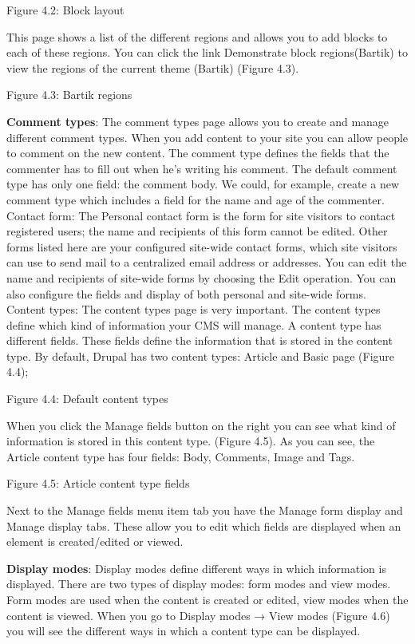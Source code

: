 Figure 4.2: Block layout

This page shows a list of the different regions and allows you to add blocks to each of these regions. You can click the link Demonstrate block regions(Bartik) to view the regions of the current theme (Bartik) (Figure 4.3).

Figure 4.3: Bartik regions

\textbf{Comment types}: The comment types page allows you to create and manage different comment types. When you add content to your site you can allow people to comment on the new content. The comment type defines the fields that the commenter has to fill out when he’s writing his comment. The default comment type has only one field: the comment body. We could, for example, create a new comment type which includes a field for the name and age of the commenter.
Contact form: The Personal contact form is the form for site visitors to contact registered users; the name and recipients of this form cannot be edited. Other forms listed here are your configured site-wide contact forms, which site visitors can use to send mail to a centralized email address or addresses. You can edit the name and recipients of site-wide forms by choosing the Edit operation. You can also configure the fields and display of both personal and site-wide forms.
Content types: The content types page is very important. The content types define which kind of information your CMS will manage. A content type has different fields. These fields define the information that is stored in the content type. By default, Drupal has two content types: Article and Basic page (Figure 4.4);

Figure 4.4: Default content types

When you click the Manage fields button on the right you can see what kind of information is stored in this content type. (Figure 4.5). As you can see, the Article content type has four fields: Body, Comments, Image and Tags.

Figure 4.5: Article content type fields

Next to the Manage fields menu item tab you have the Manage form display and Manage display tabs. These allow you to edit which fields are displayed when an element is created/edited or viewed.

\textbf{Display modes}: Display modes define different ways in which information is displayed. There are two types of display modes: form modes and view modes. Form modes are used when the content is created or edited, view modes when the content is viewed. When you go to Display modes → View modes (Figure 4.6) you will see the different ways in which a content type can be displayed.

